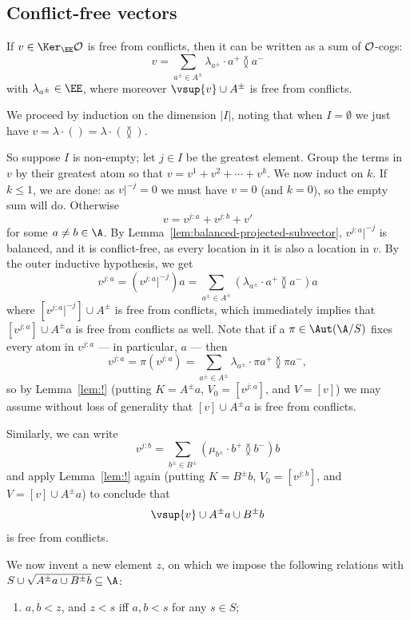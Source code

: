 \subsection{Conflict-free vectors}\label{subsec:unobstructed}
\begin{claim}\label{claim:!-free-decomposition}
    If $v \in \Ker_\EE \cal O$ is free from conflicts, then it can be written as a sum of $\cal O$-cogs:
    \[
        v = \sum_{a^\pm \in A^\pm} \lambda_{a^\pm} \cdot a^+ \between a^-
    \]
    with $\lambda_{a^\pm} \in \EE$, where moreover $\vsup{v} \cup A^\pm$ is free from conflicts.
\end{claim}
\begin{claimproof}
We proceed by induction on the dimension $|I|$, 
noting that when $I = \emptyset$ we just have $v = \lambda \cdot () = \lambda \cdot ( \between )$.

So suppose $I$ is non-empty; let $j \in I$ be the greatest element. 
Group the terms in $v$ by their greatest atom so that $v = v^1 + v^2 + \cdots + v^k$.
We now induct on $k$.
If $k \leq 1$, we are done: as $v|^{-j} = 0$ we must have $v = 0$ (and $k = 0$), so the empty sum will do.
Otherwise \[
    v = v^{j:a} + v^{j:b} + v'
\]
for some $a\neq b\in \A$. By Lemma~\ref{lem:balanced-projected-subvector}, $v^{j:a}|^{-j}$ is balanced, and it is conflict-free, as every location in it is also a location in $v$.
By the outer inductive hypothesis, we get \[
    v^{j:a} = (v^{j:a}|^{-j}) a = \sum_{a^\pm\in A^\pm} (\lambda_{a^\pm} \cdot a^+ \between a^-)a
\]
where $[v^{j:a}|^{-j}]\cup A^\pm$ is free from conflicts, which immediately implies that $[v^{j:a}]\cup A^\pm a$ is free from conflicts as well. 
Note that if a $\pi \in \Aut(\A/S)$ fixes every atom in $v^{j:a}$ --- in particular, $a$ ---  then
\[
    v^{j:a} = \pi(v^{j:a}) = \sum_{a^\pm \in A^\pm} \lambda_{a^\pm} \cdot \pi a^+ \between \pi a^-,
\]
so by Lemma~\ref{lem:!} (putting $K=A^\pm a$, $V_0=[v^{j:a}]$, and $V=[v]$) we may assume without loss of generality that
$[v]\cup A^\pm a$ is free from conflicts.

Similarly, we can write \[
    v^{j:b} = \sum_{b^\pm\in B^\pm} (\mu_{b^\pm} \cdot b^+ \between b^-)b
\]
and apply Lemma~\ref{lem:!} again (putting $K=B^\pm b$, $V_0=[v^{j:b}]$, and $V=[v]\cup A^\pm a$) to conclude that
\[
    \vsup{v} \cup A^\pm a \cup B^\pm b
\]
is free from conflicts.

We now invent a new element $z$, on which we impose the following relations with $S \cup \sqrt{A^\pm a \cup B^\pm b} \subseteq \A$: 
\begin{enumerate}
    \item $a, b < z$, and $z < s$ iff $a, b < s$ for any $s \in S$;
    

\end{enumerate}
\end{claimproof}
